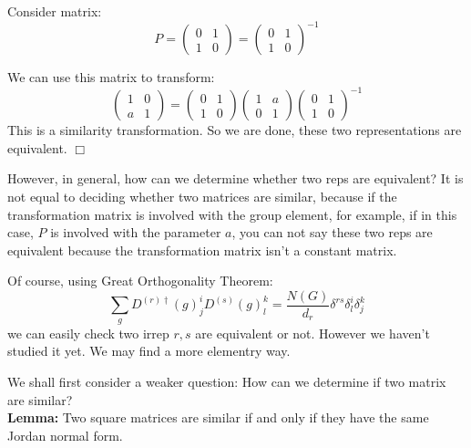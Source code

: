 \documentclass[]{ctexart}
\begin{document}
    Consider matrix:
    \begin{equation*}
      P=\begin{pmatrix}
      0 & 1\\
      1 & 0
      \end{pmatrix}
      =
      \begin{pmatrix}
      0 & 1\\
      1 & 0
      \end{pmatrix}
      ^{-1}
    \end{equation*}
    
    We can use this matrix to transform:
    \begin{equation*}
      \begin{pmatrix}
      1 & 0\\
      a & 1
      \end{pmatrix}
      =
      \begin{pmatrix}
      0 & 1\\
      1 & 0
      \end{pmatrix}
      \begin{pmatrix}
      1 & a\\
      0 & 1
      \end{pmatrix}
      \begin{pmatrix}
      0 & 1\\
      1 & 0
      \end{pmatrix}
      ^{-1}
    \end{equation*}
    This is a similarity transformation. So we are done, these two representations are equivalent. \qquad $\Box$
    
    However, in general, how can we determine whether two reps are equivalent? It is not equal to deciding whether two matrices are similar, because if the transformation matrix is involved with the group element, for example, if in this case, $P$ is involved with the parameter $a$, you can not say these two reps are equivalent because the transformation matrix isn't a constant matrix.
    
    Of course, using Great Orthogonality Theorem: 
    \begin{equation*}
    	\sum_g D^{(r)\dagger}(g)_j^i D^{(s)}(g)_l^k=\frac{N(G)}{d_r} \delta^{rs} \delta^i_l \delta^k_j
    \end{equation*}
    we can easily check two irrep $r,s$ are equivalent or not. However we haven't studied it yet. We may find a more elementry way. 
    
    We shall first consider a weaker question: How can we determine if two matrix are similar? \\
    \textbf{Lemma:} Two square matrices are similar if and only if they have the same Jordan normal form.
    
\end{document}
